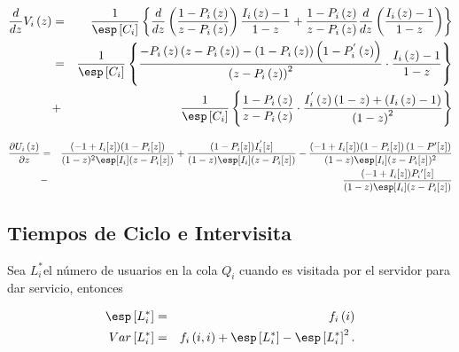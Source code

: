 \begin{eqnarray*}
\frac{d}{dz}V_{i}\left(z\right)&=&\frac{1}{\esp\left[C_{i}\right]}\left\{\frac{d}{dz}\left(\frac{1-P_{i}\left(z\right)}{z-P_{i}\left(z\right)}\right)\frac{I_{i}\left(z\right)-1}{1-z}+\frac{1-P_{i}\left(z\right)}{z-P_{i}\left(z\right)}\frac{d}{dz}\left(\frac{I_{i}\left(z\right)-1}{1-z}\right)\right\}\\
&=&\frac{1}{\esp\left[C_{i}\right]}\left\{\frac{-P_{i}\left(z\right)\left(z-P_{i}\left(z\right)\right)-\left(1-P_{i}\left(z\right)\right)\left(1-P_{i}^{'}\left(z\right)\right)}{\left(z-P_{i}\left(z\right)\right)^{2}}\cdot\frac{I_{i}\left(z\right)-1}{1-z}\right\}\\
&+&\frac{1}{\esp\left[C_{i}\right]}\left\{\frac{1-P_{i}\left(z\right)}{z-P_{i}\left(z\right)}\cdot\frac{I_{i}^{'}\left(z\right)\left(1-z\right)+\left(I_{i}\left(z\right)-1\right)}{\left(1-z\right)^{2}}\right\}
\end{eqnarray*}


\begin{eqnarray*}
\frac{\partial U_{i}\left(z\right)}{\partial z}&=&\frac{(-1+I_{i}[z]) (1-P_{i}[z])}{(1-z)^2 \esp[I_{i}] (z-P_{i}[z])}+\frac{(1-P_{i}[z]) I_{i}^{'}[z]}{(1-z) \esp[I_{i}] (z-P_{i}[z])}-\frac{(-1+I_{i}[z]) (1-P_{i}[z])\left(1-P{'}[z]\right)}{(1-z) \esp[I_{i}] (z-P_{i}[z])^2}\\
&-&\frac{(-1+I_{i}[z]) P_{i}{'}[z]}{(1-z) \esp[I_{i}](z-P_{i}[z])}
\end{eqnarray*}

\subsection{Tiempos de Ciclo e Intervisita}


\begin{Def}
Sea $L_{i}^{*}$el n\'umero de usuarios en la cola $Q_{i}$ cuando es visitada por el servidor para dar servicio, entonces

\begin{eqnarray}
\esp\left[L_{i}^{*}\right]&=&f_{i}\left(i\right)\\
Var\left[L_{i}^{*}\right]&=&f_{i}\left(i,i\right)+\esp\left[L_{i}^{*}\right]-\esp\left[L_{i}^{*}\right]^{2}.
\end{eqnarray}

\end{Def}

